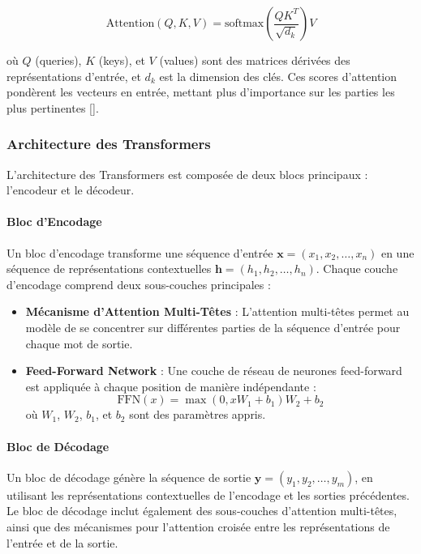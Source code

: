 \begin{equation}
	\text{Attention}(Q, K, V) = \text{softmax}\left(\frac{QK^T}{\sqrt{d_k}}\right)V
\end{equation}

où $Q$ (queries), $K$ (keys), et $V$ (values) sont des matrices dérivées des
représentations d'entrée, et $d_k$ est la dimension des clés. Ces scores
d'attention pondèrent les vecteurs en entrée, mettant plus d’importance sur les
parties les plus pertinentes [\cite{attention_is_all_you_need}].

\subsubsection{Architecture des Transformers}

L'architecture des Transformers est composée de deux blocs principaux :
l'encodeur et le décodeur.

\paragraph{Bloc d'Encodage}

Un bloc d'encodage transforme une séquence d'entrée $\mathbf{x} = (x_1, x_2,
	\ldots, x_n)$ en une séquence de représentations contextuelles $\mathbf{h} =
	(h_1, h_2, \ldots, h_n)$. Chaque couche d'encodage comprend deux sous-couches
principales :

\begin{itemize}
	\item \textbf{Mécanisme d'Attention Multi-Têtes} : L'attention multi-têtes permet au modèle de se concentrer sur différentes parties de la séquence d'entrée pour chaque mot de sortie.
	\item \textbf{Feed-Forward Network} : Une couche de réseau de neurones feed-forward est appliquée à chaque position de manière indépendante :
	      \begin{equation}
		      \text{FFN}(x) = \max(0, xW_1 + b_1)W_2 + b_2
	      \end{equation}
	      où $W_1$, $W_2$, $b_1$, et $b_2$ sont des paramètres appris.
\end{itemize}

\paragraph{Bloc de Décodage}

Un bloc de décodage génère la séquence de sortie $\mathbf{y} = (y_1, y_2,
	\ldots, y_m)$, en utilisant les représentations contextuelles de l'encodage et
les sorties précédentes. Le bloc de décodage inclut également des sous-couches
d'attention multi-têtes, ainsi que des mécanismes pour l'attention croisée
entre les représentations de l'entrée et de la sortie.

